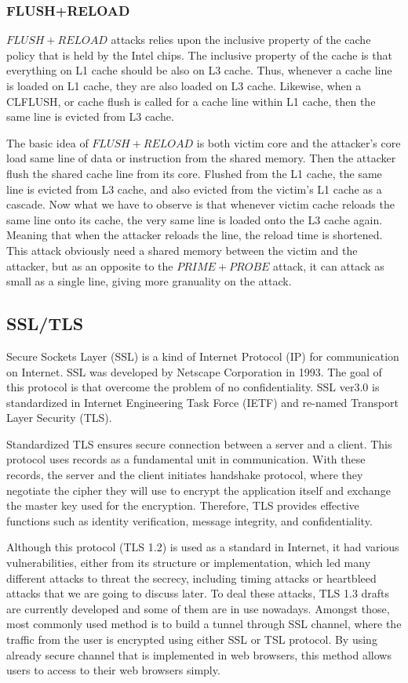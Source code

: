 \documentclass[a4paper]{article}
\begin{document}
\subsubsection{FLUSH+RELOAD}

$FLUSH+RELOAD$ attacks relies upon the inclusive property of the cache policy that is held by the Intel chips. The inclusive property of the cache is that everything on L1 cache should be also on L3 cache. Thus, whenever a cache line is loaded on L1 cache, they are also loaded on L3 cache. Likewise, when a CLFLUSH, or cache flush is called for a cache line within L1 cache, then the same line is evicted from L3 cache.\par
The basic idea of $FLUSH+RELOAD$ is both victim core and the attacker's core load same line of data or instruction from the shared memory. Then the attacker flush the shared cache line from its core. Flushed from the L1 cache, the same line is evicted from L3 cache, and also evicted from the victim's L1 cache as a cascade. Now what we have to observe is that whenever victim cache reloads the same line onto its cache, the very same line is loaded onto the L3 cache again. Meaning that when the attacker reloads the line, the reload time is shortened. This attack obviously need a shared memory between the victim and the attacker, but as an opposite to the $PRIME+PROBE$ attack, it can attack as small as a single line, giving more granuality on the attack.

\subsection{SSL/TLS}
Secure Sockets Layer (SSL) is a kind of Internet Protocol (IP) for communication on Internet. SSL was developed by Netscape Corporation in 1993. The goal of this protocol is that overcome the problem of no confidentiality. SSL ver3.0 is standardized in Internet Engineering Task Force (IETF) and re-named Transport Layer Security (TLS).

Standardized TLS \cite{TLS1, TLS2} ensures secure connection between a server and a client. This protocol uses records as a fundamental unit in communication. With these records, the server and the client initiates handshake protocol, where they negotiate the cipher they will use to encrypt the application itself and exchange the master key used for the encryption. Therefore, TLS provides effective functions such as identity verification, message integrity, and confidentiality.

Although this protocol (TLS 1.2) is used as a standard in Internet, it had various vulnerabilities, either from its structure or implementation, which led many different attacks to threat the secrecy, including timing attacks or heartbleed attacks that we are going to discuss later. To deal these attacks, TLS 1.3 drafts are currently developed and some of them are in use nowadays. Amongst those, most commonly used method is to build a tunnel through SSL channel, where the traffic from the user is encrypted using either SSL or TSL protocol. By using already secure channel that is implemented in web browsers, this method allows users to access to their web browsers simply.
\end{document}
